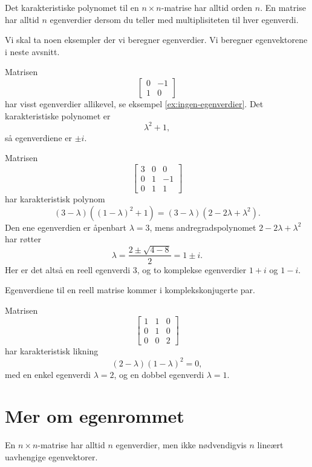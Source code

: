 \begin{thm}
Det karakteristiske polynomet til en $n\times n$-matrise har alltid orden $n$. 
En matrise har alltid $n$ egenverdier dersom du 
teller med multiplisiteten til hver egenverdi. 
\end{thm}

Vi skal ta noen eksempler der vi beregner egenverdier. Vi beregner egenvektorene i neste avsnitt.

\begin{ex}
Matrisen
\[
\begin{bmatrix}
0 & -1 \\ 1 &0
\end{bmatrix}
\]
har visst egenverdier allikevel, se eksempel \ref{ex:ingen-egenverdier}. Det karakteristiske polynomet er
\[
\lambda^2+1,
\]
så egenverdiene er $\pm i$. 
\end{ex}

\begin{ex}
Matrisen
\[
\begin{bmatrix}
3 & 0 & 0 \\ 0 & 1 & -1 \\ 0&  1 &1  
\end{bmatrix}
\]
har karakteristisk polynom
\[
(3-\lambda)((1-\lambda)^2+1)=(3-\lambda)(2-2\lambda+\lambda^2).
\]
Den ene egenverdien er åpenbart $\lambda=3$, mens andregradspolynomet $2-2\lambda+\lambda^2$ har røtter
\[
\lambda=\frac{2\pm\sqrt{4-8}}{2}=1\pm i.
\] 
Her er det altså en reell egenverdi $3$, og to komplekse egenverdier $1+i$ og $1-i$.
\end{ex}

\begin{thm}
Egenverdiene til en reell matrise kommer i komplekskonjugerte par.
\end{thm}


\begin{ex}
Matrisen
\[
\begin{bmatrix}
1 & 1 & 0\\  0 &1 & 0 \\ 0 & 0 & 2
\end{bmatrix}
\]
har karakteristisk likning
\[
(2-\lambda)(1-\lambda)^2=0,
\]
med en enkel egenverdi $\lambda=2$, og en dobbel egenverdi $\lambda=1$. 
\end{ex}


\section*{Mer om egenrommet}
En $n \times n$-matrise har alltid $n$ egenverdier, 
men ikke nødvendigvis $n$ lineært uavhengige egenvektorer.

